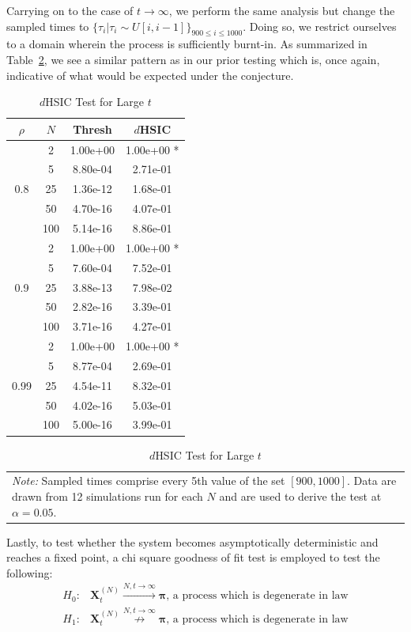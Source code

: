 Carrying on to the case of $t \rightarrow \infty$, we perform the same analysis but change the sampled times to
$\{\tau_{i} | \tau_{i} \sim U[i,i-1]\}_{900 \leq i \leq 1000}$.
Doing so, we restrict ourselves to a domain wherein the process is sufficiently burnt-in.
As summarized in Table~\ref{tab:longtime}, we see a similar pattern as in our prior testing which is, once again, indicative
of what would be expected under the conjecture.
\begin{table}
    \centering
    \caption{$d$HSIC Test for Large $t$}
    \label{tab:longtime}
    \begin{tabular}{|c|c|c|c|}
\hline
$\rho$ & $N$ & Thresh & $d$HSIC \\
\hline
\hline
 & 2 & 1.00e+00 & 1.00e+00 * \\
 & 5 & 8.80e-04 & 2.71e-01  \\
0.8 & 25 & 1.36e-12 & 1.68e-01  \\
 & 50 & 4.70e-16 & 4.07e-01  \\
 & 100 & 5.14e-16 & 8.86e-01  \\
\hline
 & 2 & 1.00e+00 & 1.00e+00 * \\
 & 5 & 7.60e-04 & 7.52e-01  \\
0.9 & 25 & 3.88e-13 & 7.98e-02  \\
 & 50 & 2.82e-16 & 3.39e-01  \\
 & 100 & 3.71e-16 & 4.27e-01  \\
\hline
 & 2 & 1.00e+00 & 1.00e+00 * \\
 & 5 & 8.77e-04 & 2.69e-01  \\
 0.99 & 25 & 4.54e-11 & 8.32e-01  \\
 & 50 & 4.02e-16 & 5.03e-01  \\
 & 100 & 5.00e-16 & 3.99e-01  \\
\hline
    \end{tabular}
    \begin{tabular}{p{10cm}}
        \textit{Note:} Sampled times comprise every 5th value of the set $[900,1000]$.
        Data are drawn from 12 simulations run for each $N$ and are used to derive the test at $\alpha = 0.05$.
    \end{tabular}
\end{table}

Lastly, to test whether the system becomes asymptotically deterministic and reaches a fixed point, a chi square
    goodness of fit test is employed to test the following:
\begin{align*}
    \label{chi 1}
    H_{0}:& \mathbf{X}^{(N)}_{t} \overset{N,t \rightarrow \infty}{\rightarrow} \mathbf{\pi} \text{, a process which is degenerate in law}  \\
    H_{1}:& \mathbf{X}^{(N)}_{t} \overset{N,t \rightarrow \infty}{\not \rightarrow} \mathbf{\pi} \text{, a process which is degenerate in law}
\end{align*}




